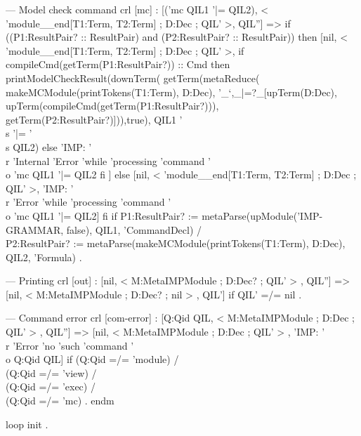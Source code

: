 \documentclass{llncs}%
\begin{document}
    --- Model check command
    crl [mc] : [('mc QIL1 '|= QIL2), < 'module__end[T1:Term, T2:Term] ; D:Dec ; QIL' >, QIL''] =>
        if ((P1:ResultPair? :: ResultPair) and (P2:ResultPair? :: ResultPair))
        then [nil, < 'module__end[T1:Term, T2:Term] ; D:Dec ; QIL' >,
              if compileCmd(getTerm(P1:ResultPair?)) :: Cmd
                  then
               printModelCheckResult(downTerm(
                   getTerm(metaReduce(
                     makeMCModule(printTokens(T1:Term), D:Dec),
                     '_`,_|=?_[upTerm(D:Dec),
                               upTerm(compileCmd(getTerm(P1:ResultPair?))),
                               getTerm(P2:ResultPair?)])),true), QIL1 '\\s '|= '\\s QIL2)
              else 'IMP: '\\r 'Internal 'Error 'while 'processing 'command '\\o 'mc QIL1 '|= QIL2
              fi ]
        else [nil, < 'module__end[T1:Term, T2:Term] ; D:Dec ; QIL' >,
                  'IMP: '\\r 'Error 'while 'processing 'command '\\o 'mc QIL1 '|= QIL2]
        fi
    if P1:ResultPair? := metaParse(upModule('IMP-GRAMMAR, false), QIL1, 'CommandDecl) /\\
           P2:ResultPair? := metaParse(makeMCModule(printTokens(T1:Term), D:Dec), QIL2, 'Formula) .


        --- Printing
    crl [out] : [nil, < M:MetaIMPModule ; D:Dec? ; QIL' > , QIL''] =>
                [nil, < M:MetaIMPModule ; D:Dec? ; nil > , QIL']
    if QIL' =/= nil .

    --- Command error
    crl [com-error] : [Q:Qid QIL, < M:MetaIMPModule ; D:Dec ; QIL' > , QIL''] =>
        [nil, < M:MetaIMPModule ; D:Dec ; QIL' > ,
             'IMP: '\\r 'Error 'no 'such 'command '\\o Q:Qid QIL]
    if (Q:Qid =/= 'module) /\\ (Q:Qid =/= 'view) /\\
           (Q:Qid =/= 'exec) /\\ (Q:Qid =/= 'mc) .
endm

loop init .
\nwendcode{}\nwdocspar
\end{document}
